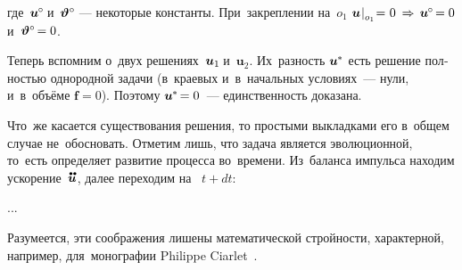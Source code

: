 \begin{otherlanguage}{russian}
\vspace{-0.25em} \noindent где~${\bm{u}^{\hspace{-0.1ex}\circ} \hspace{-0.32ex}}$ и~${\bm{\vartheta}^{\circ} \hspace{-0.5ex}}$~--- некоторые константы.
При~закреплении на~${o_1}$ ${\bm{u} \hspace{.16ex} \rvert_{\raisemath{-0.1em}{o_1}} \hspace{-0.5ex} = \hspace{.1ex} 0 \hspace{.1ex} \,\Rightarrow\, \bm{u}^{\hspace{-0.1ex}\circ} \hspace{-0.3ex} = 0}$ и~${\bm{\vartheta}^{\circ} \hspace{-0.3ex} = 0}$.

Теперь вспомним о~двух решениях~${\bm{u}_1\hspace{-0.25ex}}$ и~${\bm{u}_2}$. Их~разность ${\bm{u}^{\hspace{-0.1ex}*}}$ есть решение полностью однородной задачи (в~краевых и~в~начальных условиях~--- нули, и~в~объёме ${\bm{f} = 0}$). Поэтому ${\bm{u}^{\hspace{-0.1ex}*} \hspace{-0.32ex} = 0}$~--- единственность доказана.

Что~же касается существования решения, то простыми выкладками его в~общем случае не~обосновать. Отметим лишь, что задача является эволюционной, то~есть определяет развитие процесса во~времени. Из~баланса импульса находим ускорение~$\mathdotdotabove{\bm{u}}$, далее переходим на~ ${t + dt}$:

...


Разумеется, эти соображения лишены математической стройности, характерной, например, для~монографии Philippe Ciarlet~\cite{ciarlet-mathematicalelasticity}.

\end{otherlanguage}



